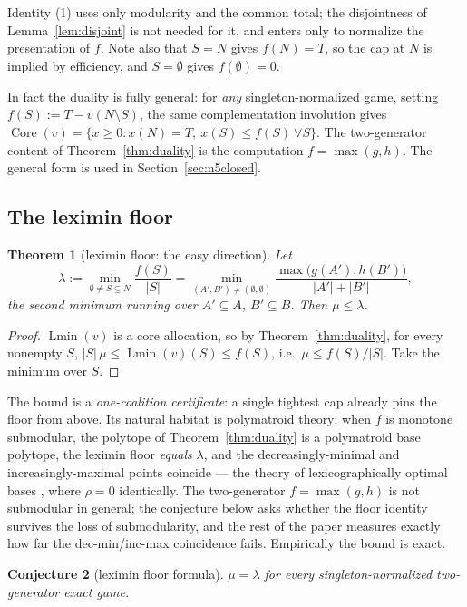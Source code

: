 \documentclass[11pt]{article}
\newtheorem{theorem}{Theorem}
\newtheorem{conjecture}[theorem]{Conjecture}
\newcommand{\core}{\operatorname{Core}}
\newcommand{\Lmin}{\operatorname{Lmin}}
\begin{document}
Identity (1) uses only modularity and the common total; the disjointness of
Lemma~\ref{lem:disjoint} is not needed for it, and enters only to normalize
the presentation of $f$.  Note also that $S=N$ gives $f(N)=T$, so the cap at
$N$ is implied by efficiency, and $S=\emptyset$ gives $f(\emptyset)=0$.

In fact the duality is fully general: for \emph{any} singleton-normalized
game, setting $f(S):=T-v(N\setminus S)$, the same complementation involution
gives $\core(v)=\{x\ge0:x(N)=T,\ x(S)\le f(S)\ \forall S\}$.  The
two-generator content of Theorem~\ref{thm:duality} is the computation
$f=\max(g,h)$.  The general form is used in Section~\ref{sec:n5closed}.

\subsection{The leximin floor}

\begin{theorem}[leximin floor: the easy direction]\label{thm:floor}
Let
\[
 \lambda:=\min_{\emptyset\ne S\subseteq N}\frac{f(S)}{|S|}
 =\min_{(A',B')\ne(\emptyset,\emptyset)}
   \frac{\max\bigl(g(A'),h(B')\bigr)}{|A'|+|B'|},
\]
the second minimum running over $A'\subseteq A$, $B'\subseteq B$.  Then
$\mu\le\lambda$.
\end{theorem}

\begin{proof}
$\Lmin(v)$ is a core allocation, so by Theorem~\ref{thm:duality}, for every
nonempty $S$,
$|S|\,\mu\le\Lmin(v)(S)\le f(S)$, i.e.\ $\mu\le f(S)/|S|$.  Take the minimum
over $S$.
\end{proof}

The bound is a \emph{one-coalition certificate}: a single tightest cap
already pins the floor from above.  Its natural habitat is polymatroid
theory: when $f$ is monotone submodular, the polytope of
Theorem~\ref{thm:duality} is a polymatroid base polytope, the leximin floor
\emph{equals} $\lambda$, and the decreasingly-minimal and
increasingly-maximal points coincide --- the theory of lexicographically
optimal bases \citep{Fujishige1980}, where $\rho=0$ identically.  The
two-generator $f=\max(g,h)$ is not submodular in general; the conjecture
below asks whether the floor identity survives the loss of submodularity,
and the rest of the paper measures exactly how far the dec-min/inc-max
coincidence fails.  Empirically the bound is exact.

\begin{conjecture}[leximin floor formula]\label{conj:floor}
$\mu=\lambda$ for every singleton-normalized two-generator exact game.
\end{conjecture}
\end{document}
